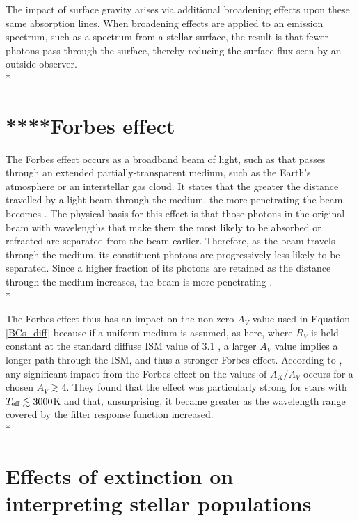 \documentclass[12pt, a4paper]{report}
\begin{document}
The impact of surface gravity arises via additional broadening effects upon these same absorption lines. When broadening effects are applied to an emission spectrum, such as a spectrum from a stellar surface, the result is that fewer photons pass through the surface, thereby reducing the surface flux seen by an outside observer. \\*

\section{****Forbes effect} \label{forbes}
The Forbes effect occurs as a broadband beam of light, such as that passes through an extended partially-transparent medium, such as the Earth's atmosphere or an interstellar gas cloud. It states that the greater the distance travelled by a light beam through the medium, the more penetrating the beam becomes \citep{1842RSPT..132..225F}. The physical basis for this effect is that those photons in the original beam with wavelengths that make them the most likely to be absorbed or refracted are separated from the beam earlier. Therefore, as the beam travels through the medium, its constituent photons are progressively less likely to be separated. Since a higher fraction of its photons are retained as the distance through the medium increases, the beam is more penetrating \citep{OHVRIL1999305}.\\*

The Forbes effect thus has an impact on the non-zero $A_{V}$ value used in Equation \ref{BCs_diff} because if a uniform medium is assumed, as here, where $R_{V}$ is held constant at the standard diffuse ISM value of 3.1 \citep{1989ApJ...345..245C}, a larger $A_{V}$ value implies a longer path through the ISM, and thus a stronger Forbes effect. According to \cite{2008PASP..120..583G}, any significant impact from the Forbes effect on the values of $A_{X}/A_{V}$ occurs for a chosen $A_{V} \gtrsim 4$. They found that the effect was particularly strong for stars with $T_{\textnormal{eff}} \lesssim 3000$K and that, unsurprising, it became greater as the wavelength range covered by the filter response function increased.\\*

\section{Effects of extinction on interpreting stellar populations} \label{extinc_desc}
\end{document}

